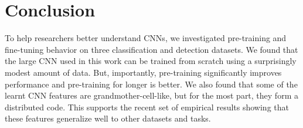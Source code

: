 \section{Conclusion}
To help researchers better understand CNNs, we investigated pre-training and fine-tuning behavior on three classification and detection datasets.
We found that the large CNN used in this work can be trained from scratch using a surprisingly modest amount of data.
But, importantly, pre-training significantly improves performance and pre-training for longer is better.
We also found that some of the learnt CNN features are grandmother-cell-like, but for the most part, they form a distributed code.
This supports the recent set of empirical results showing that these features generalize well to other datasets and tasks.
